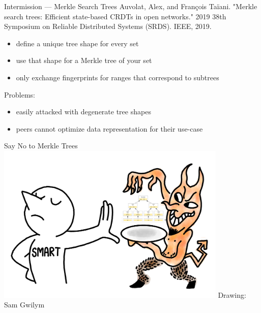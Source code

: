 \documentclass{beamer}
\begin{document}
\begin{frame}{Intermission --- Merkle Search Trees}
    Auvolat, Alex, and François Taïani. "Merkle search trees: Efficient state-based CRDTs in open networks." 2019 38th Symposium on Reliable Distributed Systems (SRDS). IEEE, 2019.

    \begin{itemize}
        \item define a unique tree shape for every set
        \item use that shape for a Merkle tree of your set
        \item only exchange fingerprints for ranges that correspond to subtrees
    \end{itemize}
    \pause
    Problems:
    \begin{itemize}
        \item easily attacked with degenerate tree shapes
        \item peers cannot optimize data representation for their use-case
    \end{itemize}
\end{frame}

\begin{frame}{Say No to Merkle Trees}
    \includegraphics[keepaspectratio=true,width=11.0cm]{sayNoToMerkleTrees.png}
    Drawing: Sam Gwilym 
\end{frame}
\end{document}
